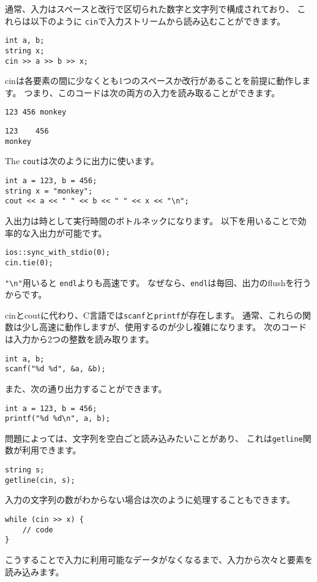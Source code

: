 通常、入力はスペースと改行で区切られた数字と文字列で構成されており、
これらは以下のように
\texttt{cin}で入力ストリームから読み込むことができます。

\begin{lstlisting}
int a, b;
string x;
cin >> a >> b >> x;
\end{lstlisting}

cinは各要素の間に少なくとも1つのスペースか改行があることを前提に動作します。
つまり、このコードは次の両方の入力を読み取ることができます。

\begin{lstlisting}
123 456 monkey
\end{lstlisting}
\begin{lstlisting}
123    456
monkey
\end{lstlisting}
The \texttt{cout}は次のように出力に使います。
\begin{lstlisting}
int a = 123, b = 456;
string x = "monkey";
cout << a << " " << b << " " << x << "\n";
\end{lstlisting}

入出力は時として実行時間のボトルネックになります。
以下を用いることで効率的な入出力が可能です。

\begin{lstlisting}
ios::sync_with_stdio(0);
cin.tie(0);
\end{lstlisting}

\texttt{"\textbackslash n"}用いると
\texttt{endl}よりも高速です。
なぜなら、\texttt{endl}は毎回、出力のflushを行うからです。

cinとcoutに代わり、C言語では\texttt{scanf}と\texttt{printf}が存在します。
通常、これらの関数は少し高速に動作しますが、使用するのが少し複雑になります。
次のコードは入力から2つの整数を読み取ります。
\begin{lstlisting}
int a, b;
scanf("%d %d", &a, &b);
\end{lstlisting}
また、次の通り出力することができます。
\begin{lstlisting}
int a = 123, b = 456;
printf("%d %d\n", a, b);
\end{lstlisting}

問題によっては、文字列を空白ごと読み込みたいことがあり、
これは\texttt{getline}関数が利用できます。

\begin{lstlisting}
string s;
getline(cin, s);
\end{lstlisting}

入力の文字列の数がわからない場合は次のように処理することもできます。
\begin{lstlisting}
while (cin >> x) {
    // code
}
\end{lstlisting}
こうすることで入力に利用可能なデータがなくなるまで、入力から次々と要素を読み込みます。

